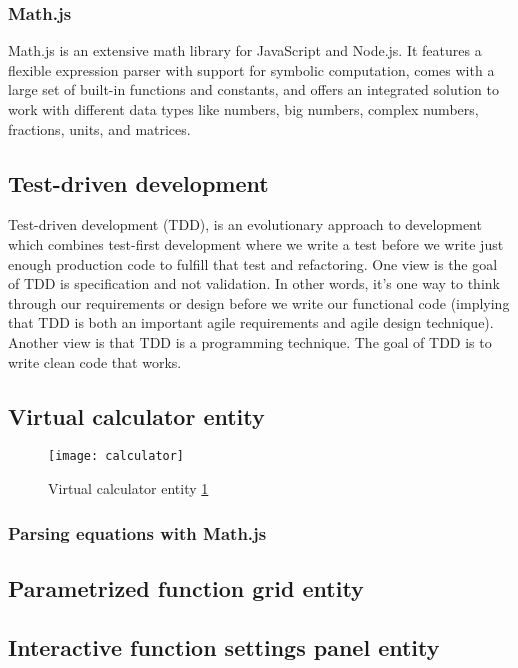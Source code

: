 \subsubsection{Math.js}
Math.js is an extensive math library for JavaScript and Node.js. It features a flexible expression parser with support for symbolic computation, comes with a large set of built-in functions and constants, and offers an integrated solution to work with different data types like numbers, big numbers, complex numbers, fractions, units, and matrices.

\subsection{Test-driven development}
Test-driven development (TDD), is an evolutionary approach to development which combines test-first development where we write a test before we write just enough production code to fulfill that test and refactoring. One view is the goal of TDD is specification and not validation.  In other words, it’s one way to think through our requirements or design before we write our functional code (implying that TDD is both an important agile requirements and agile design technique). Another view is that TDD is a programming technique. The goal of TDD is to write clean code that works.

\subsection{Virtual calculator entity}

\begin{figure}[ht!]
\centering
\texttt{[image: calculator]}
\caption{Virtual calculator entity \ref{r:2}}
\label{r:2}
\end{figure}

\subsubsection{Parsing equations with Math.js}

\subsection{Parametrized function grid entity}

\subsection{Interactive function settings panel entity}

